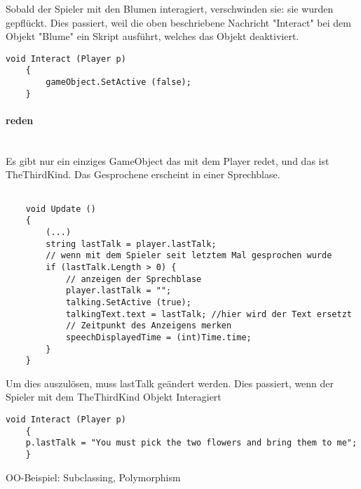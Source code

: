 Sobald der Spieler mit den Blumen interagiert, verschwinden sie: sie wurden gepflückt.
Dies passiert, weil die oben beschriebene Nachricht "Interact" bei dem Objekt "Blume" ein Skript ausführt, welches das Objekt deaktiviert.
\begin{lstlisting}
void Interact (Player p)
	{
		gameObject.SetActive (false);
	}
\end{lstlisting}
 
\paragraph{reden}\mbox{} \\
 
 Es gibt nur ein einziges GameObject das mit dem Player redet, und das ist TheThirdKind.
 Das Gesprochene erscheint in einer Sprechblase.
 
\begin{lstlisting}[caption={Gesprochenes aktualisieren}]

	void Update ()
	{
		(...)
		string lastTalk = player.lastTalk;
		// wenn mit dem Spieler seit letztem Mal gesprochen wurde
		if (lastTalk.Length > 0) {
			// anzeigen der Sprechblase
			player.lastTalk = "";
			talking.SetActive (true);
			talkingText.text = lastTalk; //hier wird der Text ersetzt
			// Zeitpunkt des Anzeigens merken
			speechDisplayedTime = (int)Time.time;
		} 
	}
\end{lstlisting}
Um dies auszulösen, muss lastTalk geändert werden.
Dies passiert, wenn der Spieler mit dem TheThirdKind Objekt Interagiert 
\begin{lstlisting}
void Interact (Player p)
	{
	p.lastTalk = "You must pick the two flowers and bring them to me";
	}
\end{lstlisting}


OO-Beispiel: Subclassing, Polymorphism

